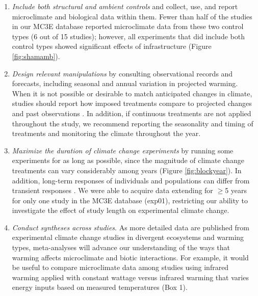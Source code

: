 \documentclass{article}
\begin{document}
\begin{enumerate}
\item\textit{Include both structural and ambient controls} and collect, use, and report microclimate and biological data within them. Fewer than half of the studies in our MC3E database reported microclimate data from these two control types (6 out of 15 studies); however, all experiments that did include both control types showed significant effects of infrastructure (Figure \ref{fig:shamamb}).
\item\textit{Design relevant manipulations} by consulting observational records and forecasts, including seasonal and annual variation in projected warming. When it is not possible or desirable to match anticipated changes in climate, studies should report how imposed treatments compare to projected changes and past observations \citep[e.g.,][]{hoover2014, zhu2016}. In addition, if continuous treatments are not applied throughout the study, we recommend reporting the seasonality and timing of treatments and monitoring the climate throughout the year.

\item\textit{Maximize the duration of climate change experiments} by running some experiments for as long as possible, since the magnitude of climate change treatments can vary considerably among years (Figure \ref{fig:blockyear}). In addition, long-term responses of individuals and populations can differ from transient responses \citep{saleska2002,franklin1989,giasson2013,harte2015}. We were able to acquire data extending for $\geq$5 years for only one study in the MC3E database (exp01), restricting our ability to investigate the effect of study length on experimental climate change. %
\item\textit{Conduct syntheses across studies}. As more detailed data are published from experimental climate change studies in divergent ecosystems and warming types, meta-analyses will advance our understanding of the ways that warming affects microclimate and biotic interactions. For example, it would be useful to compare microclimate data among studies using infrared warming applied with constant wattage versus infrared warming that varies energy inputs based on measured temperatures (Box 1). 

\end{enumerate}



\end{document}
